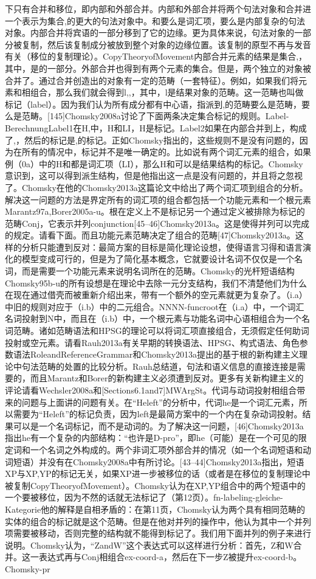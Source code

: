 下只有合并和移位，即内部和外部合并。内部和外部合并将两个句法对象和合并进一个表示为集合,的更大的句法对象中。和要么是词汇项，要么是内部复杂的句法对象。内部合并将宾语的一部分移到了它的边缘。更为具体来说，句法对象的一部分被复制，然后该复制成分被放到整个对象的边缘位置。该复制的原型不再与发音有关（移位的复制理论）。CopyTheoryofMovement内部合并元素的结果是集合,，其中，是的一部分。外部合并也得到有两个元素的集合。但是，两个独立的对象被合并了。通过合并创造出的对象有一定的范畴（一套特征）。例如，如果我们将元素和相组合，那么我们就会得到l,,，其中，l是结果对象的范畴。这一范畴也叫做标记（label）。因为我们认为所有成分都有中心语，指派到,的范畴要么是范畴，要么是范畴。[145]Chomsky2008a讨论了下面两条决定集合标记的规则。Label-BerechnungLabel1在H,中，H和LI，H是标记。Label2如果在内部合并到上，构成了,，然后的标记是,的标记。正如Chomsky指出的，这些规则不是没有问题的，因为在所有的情况中，标记并不是唯一确定的。比如说有两个词汇元素的组合，如果例（0a）中的H和都是词汇项（LI），那么H和可以是结果结构的标记。Chomsky意识到，这可以得到派生结构，但是他指出这一点是没有问题的，并且将之忽视了。Chomsky在他的Chomsky2013a这篇论文中给出了两个词汇项到组合的分析。解决这一问题的方法是界定所有的词汇项的组合都包括一个功能元素和一个根元素Marantz97a,Borer2005a-u。根在定义上不是标记另一个通过定义被排除为标记的范畴Conj，它表示并列conjunction[45--46]Chomsky2013a。这是使得并列可以完成的规定。请看下面。而且功能元素范畴决定了组合的范畴[47]Chomsky2013a。这样的分析只能遭到反对：最简方案的目标是简化理论设想，使得语言习得和语言演化的模型变成可行的，但是为了简化基本概念，它就要设计名词不仅仅是一个名词，而是需要一个功能元素来说明名词所在的范畴。Chomsky的光杆短语结构Chomsky95b-u的所有设想是在理论中去除一元分支结构，我们不清楚他们为什么在现在通过借壳而被重新介绍出来，带有一个额外的空元素就更为复杂了。（i.a）中旧的规则对应于（i.b）中的二元组合。NNNN-funcroot在（i.a）中，一个词汇名词投射到N中，而且在（i.b）中，一个根元素与功能名词中心语相组合为一个名词范畴。诸如范畴语法和HPSG的理论可以将词汇项直接组合，无须假定任何助词投射或空元素。请看Rauh2013a有关早期的转换语法、HPSG、构式语法、角色参数语法RoleandReferenceGrammar和Chomsky2013a提出的基于根的新构建主义理论中句法范畴的处置的比较分析。Rauh总结道，句法和语义信息的直接连接是需要的，而且Marantz和Borer的新构建主义必须遭到反对。更多有关新构建主义的评论请看Wechsler2008a和[Sections6.1and7]MWArgSt。代词与动词投射相组合带来的问题与上面讲的问题有关。在“Heleft”的分析中，代词he是一个词汇元素，所以需要为“Heleft”的标记负责，因为left是最简方案中的一个内在复杂动词投射。结果可以是一个名词标记，而不是动词的。为了解决这一问题，[46]Chomsky2013a指出he有一个复杂的内部结构：“也许是D-pro”，即he（可能）是在一个可见的限定词和一个名词之外构成的。两个非词汇项外部合并的情况（如一个名词短语和动词短语）并没有在Chomsky2008a中有所讨论。[43--44]Chomsky2013a指出，短语XP与XP,YP的标记无关，如果XP进一步被移位的话（或者是在移位的复制理论中被复制CopyTheoryofMovement）。Chomsky认为在XP,YP组合中的两个短语中的一个要被移位，因为不然的话就无法标记了（第12页）。fn-labeling-gleiche-Kategorie他的解释是自相矛盾的：在第11页，Chomsky认为两个具有相同范畴的实体的组合的标记就是这个范畴。但是在他对并列的操作中，他认为其中一个并列项需要被移动，否则完整的结构就不能得到标记了。我们用下面并列的例子来进行说明。Chomsky认为，“ZandW”这个表达式可以这样进行分析：首先，Z和W合并。这一表达式再与Conj相组合ex-coord-a，然后在下一步Z被提升ex-coord-b。Chomsky-pr